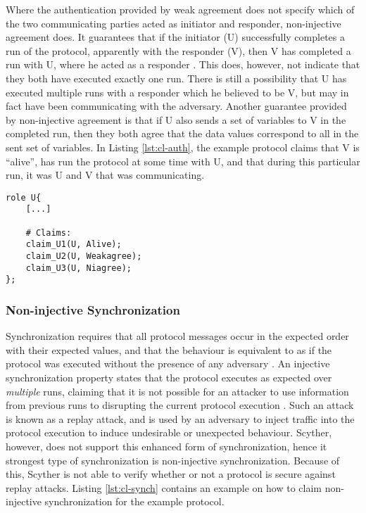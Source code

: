 Where the authentication provided by weak agreement does not specify which of the two communicating parties acted as initiator and responder, non-injective agreement does. It guarantees that if the initiator (U) successfully completes a run of the protocol, apparently with the responder (V), then V has completed a run with U, where he acted as a responder \cite{lowe1997hierarchy}. This does, however, not indicate that they both have executed exactly one run. There is still a possibility that U has executed multiple runs with a responder which he believed to be V, but may in fact have been communicating with the adversary. Another guarantee provided by non-injective agreement is that if U also sends a set of variables to V in the completed run, then they both agree that the data values correspond to all in the sent set of variables. In Listing \ref{lst:cl-auth}, the example protocol claims that V is ``alive'', has run the protocol at some time with U, and that during this particular run, it was U and V that was communicating.\newline

\begin{lstlisting}[caption={Example of how to claim authentication by use of alive, weak-agreement, and non-injective agreement.}, label={lst:cl-auth}]
role U{
	[...]
	
	# Claims:
	claim_U1(U, Alive);
	claim_U2(U, Weakagree);
	claim_U3(U, Niagree);
};
\end{lstlisting} 


\subsubsection{Non-injective Synchronization}

Synchronization requires that all protocol messages occur in the expected order with their expected values, and that the behaviour is equivalent to as if the protocol was executed without the presence of any adversary \cite{cremers2006injective}. An injective synchronization property states that the protocol executes as expected over \emph{multiple} runs, claiming that it is not possible for an attacker to use information from previous runs to disrupting the current protocol execution \cite{cremers2005operational}. Such an attack is known as a replay attack, and is used by an adversary to inject traffic into the protocol execution to induce undesirable or unexpected behaviour. Scyther, however, does not support this enhanced form of synchronization, hence it strongest type of synchronization is non-injective synchronization. Because of this, Scyther is not able to verify whether or not a protocol is secure against replay attacks. Listing \ref{lst:cl-synch} contains an example on how to claim non-injective synchronization for the example protocol.\newline

